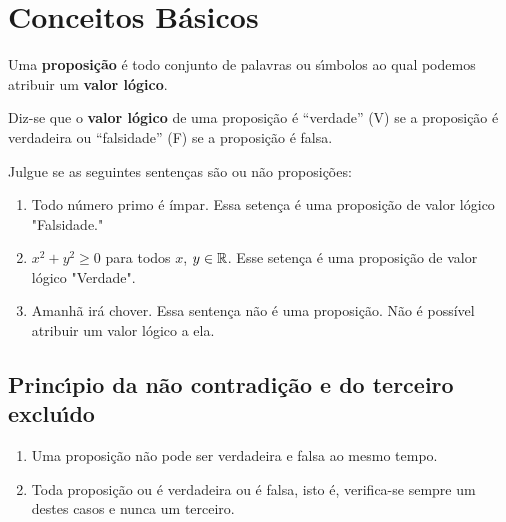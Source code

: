\chapter{Conceitos B\'asicos} %
\label{cha:conceitos_basicos}

\begin{definicao}
	Uma \textbf{proposi\c{c}\~ao} \'e todo conjunto de palavras ou s{\'\i}mbolos ao qual podemos atribuir um \textbf{valor l\'ogico}.
\end{definicao}

\begin{definicao}
	Diz-se que o \textbf{valor l\'ogico} de uma proposi\c{c}\~ao \'e ``verdade'' (V) se a proposi\c{c}\~ao \'e verdadeira ou ``falsidade'' (F) se a proposi\c{c}\~ao \'e falsa.
\end{definicao}

\begin{exemplos}
	Julgue se as seguintes sentenças são ou não proposições:
	\begin{enumerate}
		\item Todo número primo é ímpar.
		Essa setença é uma proposição de valor lógico "Falsidade."
		\item $x^2 + y^2 \ge 0$ para todos $x$, $y \in \mathbb{R}$.
		Esse setença é uma proposição de valor lógico "Verdade".
		\item Amanhã irá chover.
		Essa sentença não é uma proposição. Não é possível atribuir um valor lógico a ela.
	\end{enumerate}

\end{exemplos}

\section{Princ{\'\i}pio da n\~ao contradi\c{c}\~ao e do terceiro exclu{\'\i}do} %
\label{sec:principio_da_nao_contradicao_e_do_3}
\begin{enumerate}
	\item Uma proposi\c{c}\~ao n\~ao pode ser verdadeira e falsa ao mesmo tempo.
	\item Toda proposi\c{c}\~ao ou \'e verdadeira ou \'e falsa, isto \'e, verifica-se sempre um destes casos e nunca um terceiro.
\end{enumerate}

